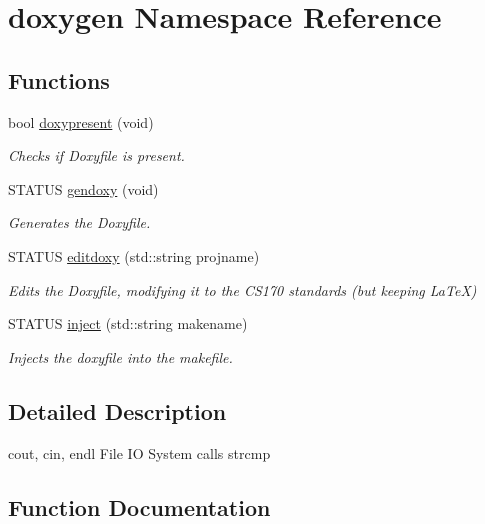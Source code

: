 \hypertarget{namespacedoxygen}{}\section{doxygen Namespace Reference}
\label{namespacedoxygen}
\subsection*{Functions}
\begin{DoxyCompactItemize}
\item 
bool \mbox{\hyperlink{namespacedoxygen_ac32b830653782b279d35ca231bcf8fd2}{doxypresent}} (void)
\begin{DoxyCompactList}\small\item\em Checks if Doxyfile is present. \end{DoxyCompactList}\item 
S\+T\+A\+T\+US \mbox{\hyperlink{namespacedoxygen_a5c87bdeb24d13f1c2a9024fd7e95c322}{gendoxy}} (void)
\begin{DoxyCompactList}\small\item\em Generates the Doxyfile. \end{DoxyCompactList}\item 
S\+T\+A\+T\+US \mbox{\hyperlink{namespacedoxygen_a5c6a31d9a2fe806735c143e190d1f462}{editdoxy}} (std\+::string projname)
\begin{DoxyCompactList}\small\item\em Edits the Doxyfile, modifying it to the C\+S170 standards (but keeping La\+TeX) \end{DoxyCompactList}\item 
S\+T\+A\+T\+US \mbox{\hyperlink{namespacedoxygen_a57d0262c121e64948a97830bb84e480c}{inject}} (std\+::string makename)
\begin{DoxyCompactList}\small\item\em Injects the doxyfile into the makefile. \end{DoxyCompactList}\end{DoxyCompactItemize}


\subsection{Detailed Description}
cout, cin, endl File IO System calls strcmp 

\subsection{Function Documentation}
\mbox{\label{namespacedoxygen_ac32b830653782b279d35ca231bcf8fd2}} 
